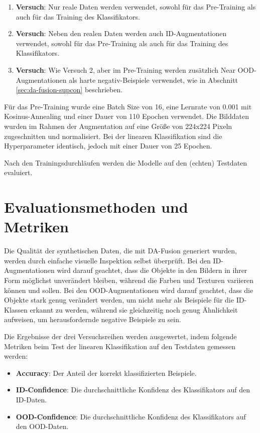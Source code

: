 \begin{enumerate}[font=\bfseries]
	\item \textbf{Versuch}: Nur reale Daten werden verwendet, sowohl für das Pre-Training als auch für das Training des Klassifikators.
	\item \textbf{Versuch}: Neben den realen Daten werden auch ID-Augmentationen verwendet, sowohl für das Pre-Training als auch für das Training des Klassifikators.
	\item \textbf{Versuch}: Wie Versuch 2, aber im Pre-Training werden zusätzlich Near OOD-Augmentationen als harte negativ-Beispiele verwendet, wie in Abschnitt \ref{sec:da-fusion-supcon} beschrieben.
\end{enumerate}

Für das Pre-Training wurde eine Batch Size von 16, eine Lernrate von 0.001 mit Kosinus-Annealing und einer Dauer von 110 Epochen verwendet. Die Bilddaten wurden im Rahmen der Augmentation auf eine Größe von 224x224 Pixeln zugeschnitten und normalisiert. Bei der linearen Klassifikation sind die Hyperparameter identisch, jedoch mit einer Dauer von 25 Epochen.

Nach den Trainingsdurchläufen werden die Modelle auf den (echten) Testdaten evaluiert.

\section{Evaluationsmethoden und Metriken} \label{sec:evaluation}

Die Qualität der synthetischen Daten, die mit DA-Fusion generiert wurden, werden durch einfache visuelle Inspektion selbst überprüft. Bei den ID-Augmentationen wird darauf geachtet, dass die Objekte in den Bildern in ihrer Form möglichst unverändert bleiben, während die Farben und Texturen variieren können und sollen. Bei den OOD-Augmentationen wird darauf geachtet, dass die Objekte stark genug verändert werden, um nicht mehr als Beispiele für die ID-Klassen erkannt zu werden, während sie gleichzeitig noch genug Ähnlichkeit aufweisen, um herausfordernde negative Beispiele zu sein.

Die Ergebnisse der drei Versuchsreihen werden ausgewertet, indem folgende Metriken beim Test der linearen Klassifikation auf den Testdaten gemessen werden:

\begin{itemize}
	\item \textbf{Accuracy}: Der Anteil der korrekt klassifizierten Beispiele.
	\item \textbf{ID-Confidence}: Die durchschnittliche Konfidenz des Klassifikators auf den ID-Daten.
	\item \textbf{OOD-Confidence}: Die durchschnittliche Konfidenz des Klassifikators auf den OOD-Daten.
\end{itemize}
